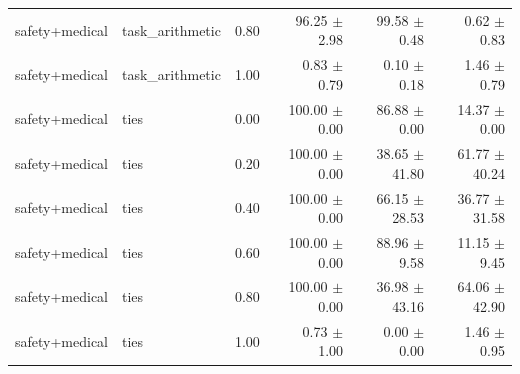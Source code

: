 \documentclass{article}
\begin{document}
\begin{table}[H]
{\begin{tabular}{lllrrr}
safety+medical & task\_arithmetic & 0.80 & 96.25 $\pm$ 2.98 & 99.58 $\pm$ 0.48 & 0.62 $\pm$ 0.83 \\
safety+medical & task\_arithmetic & 1.00 & 0.83 $\pm$ 0.79 & 0.10 $\pm$ 0.18 & 1.46 $\pm$ 0.79 \\
safety+medical & ties & 0.00 & 100.00 $\pm$ 0.00 & 86.88 $\pm$ 0.00 & 14.37 $\pm$ 0.00 \\
safety+medical & ties & 0.20 & 100.00 $\pm$ 0.00 & 38.65 $\pm$ 41.80 & 61.77 $\pm$ 40.24 \\
safety+medical & ties & 0.40 & 100.00 $\pm$ 0.00 & 66.15 $\pm$ 28.53 & 36.77 $\pm$ 31.58 \\
safety+medical & ties & 0.60 & 100.00 $\pm$ 0.00 & 88.96 $\pm$ 9.58 & 11.15 $\pm$ 9.45 \\
safety+medical & ties & 0.80 & 100.00 $\pm$ 0.00 & 36.98 $\pm$ 43.16 & 64.06 $\pm$ 42.90 \\
safety+medical & ties & 1.00 & 0.73 $\pm$ 1.00 & 0.00 $\pm$ 0.00 & 1.46 $\pm$ 0.95 \\
\bottomrule
\end{tabular}
}
\end{table}


\begin{table}[H]
\centering
\caption{予備実験 シード別詳細 - Method: mergealign, Pattern: safety+medical}
\label{tab:prelim_seeds_mergealign_safety_medical}
\small
{}
\end{table}
\end{document}
